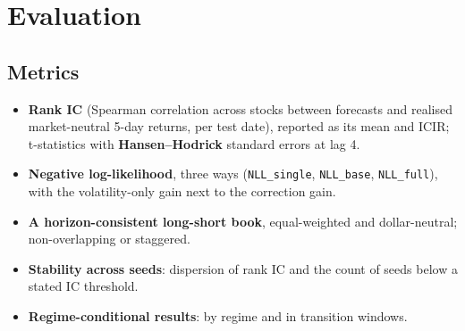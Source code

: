 \section{Evaluation}
\label{sec:evaluation}

\subsection{Metrics}

\begin{itemize}
\item \textbf{Rank IC} (Spearman correlation across stocks between forecasts and realised market-neutral 5-day
  returns, per test date), reported as its mean and ICIR; t-statistics with \textbf{Hansen--Hodrick} standard
  errors at lag 4. 
\item \textbf{Negative log-likelihood}, three ways (\texttt{NLL\_single}, \texttt{NLL\_base},
  \texttt{NLL\_full}), with the volatility-only gain next to the correction gain.
\item \textbf{A horizon-consistent long-short book}, equal-weighted and dollar-neutral; non-overlapping or
  staggered. 
\item \textbf{Stability across seeds}: dispersion of rank IC and the count of seeds below a stated IC threshold.
\item \textbf{Regime-conditional results}: by regime and in transition windows.
\end{itemize}

